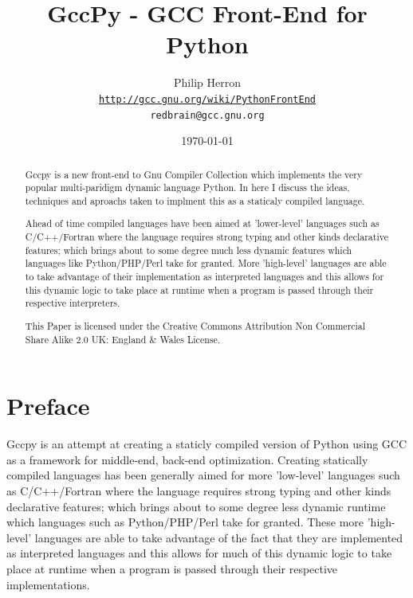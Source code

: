 \documentclass[defaultstyle,11pt]{article}
\begin{document}
\renewcommand\floatpagefraction{.9}
\renewcommand\topfraction{.9}
\renewcommand\bottomfraction{.9}
\renewcommand\textfraction{.1}   
\setcounter{totalnumber}{50}
\setcounter{topnumber}{50}
\setcounter{bottomnumber}{50}

\title{GccPy - GCC Front-End for Python}
\author{Philip Herron\\
  \texttt{\url {http://gcc.gnu.org/wiki/PythonFrontEnd}}\\
  \texttt{redbrain@gcc.gnu.org} \\
\byncsa}
\date{\today}
\maketitle
\begin{abstract}
Gccpy is a new front-end to Gnu Compiler Collection which implements the
very popular multi-paridigm dynamic language Python. In here I discuss the
ideas, techniques and aproachs taken to implment this as a staticaly compiled
language.

Ahead of time compiled languages have
been  aimed at 'lower-level' languages such as C/C++/Fortran where the language requires
strong typing and other kinds declarative features; which brings about to some degree much less dynamic
features which languages like Python/PHP/Perl take for granted. More 'high-level' 
languages are able to take advantage of their implementation as interpreted
languages and this allows for this dynamic logic to take place at runtime when a program is passed
through their respective interpreters.

This Paper is licensed under the Creative Commons Attribution Non Commercial Share Alike 2.0 UK: England \& Wales License.
\end{abstract}

\newpage

\tableofcontents
\listoffigures
\lstlistoflistings
\printnomenclature[2.5cm]

\section{Preface}
Gccpy is an attempt at creating a staticly compiled version of Python using GCC as a framework for
middle-end, back-end optimization. Creating statically compiled languages has
been generally aimed for more 'low-level' languages such as C/C++/Fortran where the language requires
strong typing and other kinds declarative features; which brings about to some degree less dynamic
runtime which languages such as Python/PHP/Perl take for granted. These more 'high-level' 
languages are able to take advantage of the fact that they are implemented as interpreted
languages and this allows for much of this dynamic logic to take place at runtime when a program is passed
through their respective implementations.
\end{document}
